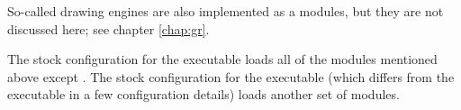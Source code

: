 So-called drawing engines are also implemented as a modules,
but they are not discussed here; see chapter \ref{chap:gr}.

The stock configuration for the  executable loads all of the 
modules mentioned above except .
The stock configuration for the  executable (which differs
from the  executable in a few configuration details)
loads another set of modules.



